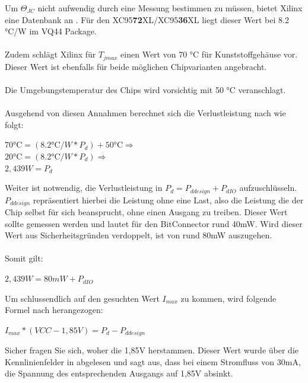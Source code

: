 \documentclass{article}
\begin{document}
Um $\Theta_{JC}$ nicht aufwendig durch eine Messung bestimmen zu müssen, bietet Xilinx eine Datenbank an \autocite{ThetaJC}. Für den XC95\textbf{72}XL/XC95\textbf{36}XL liegt dieser Wert bei 8.2 \si{\celsius}/W im VQ44 Package.\\\\
Zudem schlägt Xilinx für $T_{jmax}$ einen Wert von 70 \si{\celsius} für Kunststoffgehäuse vor. Dieser Wert ist ebenfalls für beide möglichen Chipvarianten angebracht.\\\\
Die Umgebungstemperatur des Chips wird vorsichtig mit 50 \si{\celsius} veranschlagt.\\\\
Ausgehend von diesen Annahmen berechnet sich die Verlustleistung nach \autocite[16]{XC95_maxI} wie folgt:

\begin{center}
	$70 \si{\celsius} = (8.2 \si{\celsius}/W*P_d)+50 \si{\celsius} \Rightarrow$\\
	$20 \si{\celsius} = (8.2 \si{\celsius}/W*P_d)\Rightarrow$\\
	$2,439 W = P_d$\\ \vspace{0.5cm}
\end{center}
	Weiter ist notwendig, die Verlustleistung in $P_d = P_{ddesign} + P_{dIO}$ aufzuschlüsseln.
$P_{ddesign}$ repräsentiert hierbei die Leistung ohne eine Last, also die Leistung die der Chip selbst für sich beansprucht, ohne einen Ausgang zu treiben. Dieser Wert sollte gemessen werden und lautet für den BitConnector rund 40mW. Wird dieser Wert aus Sicherheitsgründen verdoppelt, ist von rund 80mW auszugehen.\\\\
Somit gilt: 
\begin{center}
	$2,439 W = 80mW + P_{dIO}$
\end{center}

Um schlussendlich auf den gesuchten Wert $I_{max}$ zu kommen, wird folgende Formel nach \autocite[16]{XC95_maxI} herangezogen:

\begin{center}
	$I_{max} * (VCC - 1,85V) = P_d - P_{ddesign}$
\end{center}

Sicher fragen Sie sich, woher die 1,85V herstammen. Dieser Wert wurde über die Kennlinienfelder in \autocite[6]{XC_Curves} abgelesen und sagt aus, dass bei einem Stromfluss von 30mA, die Spannung des entsprechenden Ausgangs auf 1,85V absinkt.
\end{document}
